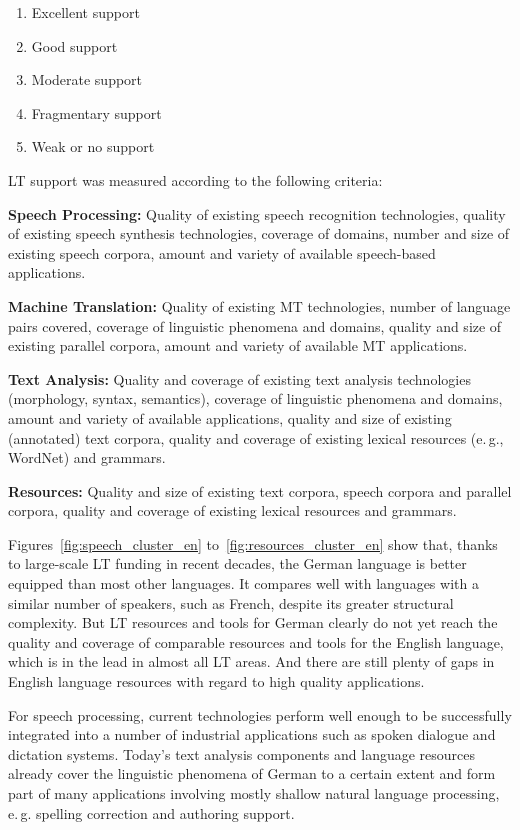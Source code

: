 \documentclass[]{../../metanetpaper}
\begin{document}
\begin{multicols}{2}
\begin{enumerate}
\item Excellent support
\item Good support
\item Moderate support
\item Fragmentary support
\item Weak or no support
\end{enumerate}

LT support was measured according to the following criteria:

\textbf{Speech Processing:} Quality of existing speech recognition technologies, quality of existing speech synthesis technologies, coverage of domains, number and size of existing speech corpora, amount and variety of available speech-based applications.

\textbf{Machine Translation:} Quality of existing MT technologies, number of language pairs covered, coverage of linguistic phenomena and domains, quality and size of existing parallel corpora, amount and variety of available MT applications.

\textbf{Text Analysis:} Quality and coverage of existing text analysis technologies (morphology, syntax, semantics), coverage of linguistic phenomena and domains, amount and variety of available applications, quality and size of existing (annotated) text corpora, quality and coverage of existing lexical resources (e.\,g., WordNet) and grammars.

\textbf{Resources:} Quality and size of existing text corpora, speech corpora and parallel corpora, quality and coverage of existing lexical resources and grammars.

Figures~\ref{fig:speech_cluster_en} to~\ref{fig:resources_cluster_en} show that, thanks to large-scale LT funding in recent decades, the German language is better equipped than most other languages. It compares well with languages with a similar number of speakers, such as French, despite its greater structural complexity. But LT resources and tools for German clearly do not yet reach the quality and coverage of comparable resources and tools for the English language, which is in the lead in almost all LT areas. And there are still plenty of gaps in English language resources with regard to high quality applications.

For speech processing, current technologies perform well enough to be successfully integrated into a number of industrial applications such as spoken dialogue and dictation systems. Today’s text analysis components and language resources already cover the linguistic phenomena of German to a certain extent and form part of many applications involving mostly shallow natural language processing, e.\,g. spelling correction and authoring support.


\end{multicols}
\end{document}
